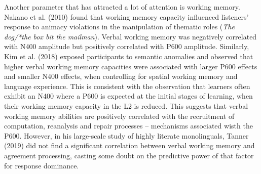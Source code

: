 \documentclass[11pt]{article}
\newenvironment{styleStandard}{\renewcommand\baselinestretch{1.0}\setlength\leftskip{0cm}\setlength\rightskip{0cm plus 1fil}\setlength\parindent{0cm}\setlength\parfillskip{0pt plus 1fil}\setlength\parskip{0in plus 1pt}\writerlistparindent\writerlistleftskip\leavevmode\normalfont\normalsize\writerlistlabel\ignorespaces}{\unskip\vspace{0.111in plus 0.0111in}\par}
\newcommand\writerlistleftskip{}
\newcommand\writerlistparindent{}
\newcommand\writerlistlabel{}
\begin{document}
\begin{styleStandard}
Another parameter that has attracted a lot of attention is working memory. Nakano et al. (2010) found that working memory capacity influenced listeners’ response to animacy violations in the manipulation of thematic roles (\textit{The dog/*the box bit the mailman}). Verbal working memory was negatively correlated with N400 amplitude but positively correlated with P600 amplitude. Similarly, Kim et al. (2018) exposed participants to semantic anomalies and observed that higher verbal working memory capacities were associated with larger P600 effects and smaller N400 effects, when controlling for spatial working memory and language experience. This is consistent with the observation that learners often exhibit an N400 where a P600 is expected at the initial stages of learning, when their working memory capacity in the L2 is reduced. This suggests that verbal working memory abilities are positively correlated with the recruitment of computation, reanalysis and repair processes – mechanisms associated wisth the P600. However, in his large-scale study of highly literate monolinguals, Tanner (2019) did not find a significant correlation between verbal working memory and agreement processing, casting some doubt on the predictive power of that factor for response dominance. 
\end{styleStandard}
\end{document}
